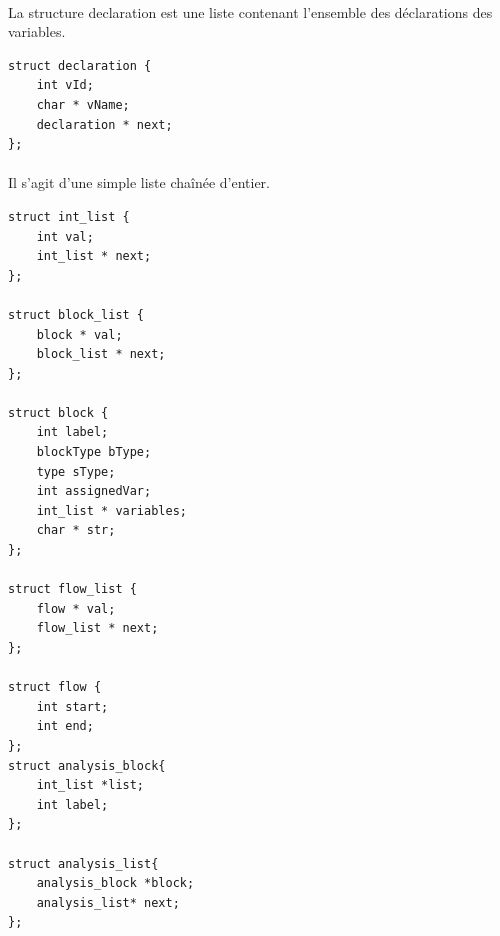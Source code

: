 \documentclass[12pt,a4paper,oneside]{article}
\begin{document}
\paragraph{}
La structure declaration est une liste contenant l'ensemble des déclarations des variables.
\begin{lstlisting}
struct declaration {
	int vId;
	char * vName;
	declaration * next;
};
\end{lstlisting}
\paragraph{}
Il s'agit d'une simple liste chaînée d'entier.
\begin{lstlisting}
struct int_list {
	int val;
	int_list * next;
};

struct block_list {
	block * val;
	block_list * next;
};

struct block {
	int label;
	blockType bType;
	type sType;
	int assignedVar;
	int_list * variables;
	char * str;
};

struct flow_list {
	flow * val;
	flow_list * next;
};

struct flow {
	int start;
	int end;
};
struct analysis_block{
	int_list *list;
	int label;
};

struct analysis_list{
	analysis_block *block;
	analysis_list* next;
};
\end{lstlisting}
\newpage
\end{document}
